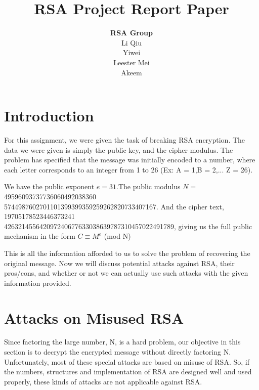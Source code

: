 \documentclass[12pt]{article} %
\title{RSA Project Report Paper}
\author{\textbf{RSA Group}\\Li Qiu\\Yiwei \\Leester Mei\\Akeem}
\begin{document}
	\maketitle
	
	\section{Introduction}
	For this assignment, we were given the task of breaking RSA encryption. The data we were given is simply the public key, and the cipher modulus. The problem has specified that the message was initially encoded to a number, where each letter corresponds to an integer from 1 to 26 (Ex: A = 1,B = 2,... Z = 26).
	
	We have the public exponent $ e = 31 $.The public modulus $N=$  49596093737736060492038360\\5744987602701101399399359259262820733407167.
	And the cipher text, 19705178523446373241\\426321455642097240677633038639787310457022491789, giving us the full public mechanism in the form $ C \equiv M^{e} $ (mod N) 
	
	\indent This is all the information afforded to us to solve the problem of recovering the original message. Now we will discuss potential attacks against RSA, their pros/cons, and whether or not we can actually use such attacks with the given information provided.
	
	\section{Attacks on Misused RSA}
	Since factoring the large number, N, is a hard problem, our objective in this section is to decrypt the encrypted message without directly factoring N.
	Unfortunately, most of these special attacks are based on misuse of RSA.
	So, if the numbers, structures and implementation of RSA are designed well and used properly, these kinds of attacks are not applicable against RSA.
	
\end{document}
